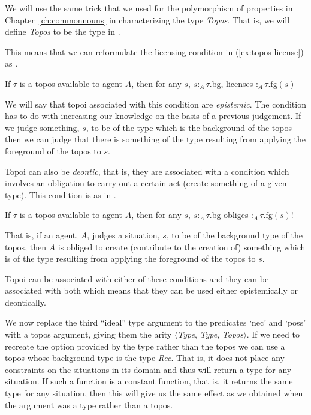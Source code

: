 We will use the same trick that we used
for the polymorphism of properties in Chapter~\ref{ch:commonnouns} in
characterizing the type \textit{Topos}.  That is, we will define
\textit{Topos} to be the type in \nexteg{}.
\begin{ex} 
\end{ex}

This means that we can reformulate the licensing condition in
(\ref{ex:topos-license}) as \nexteg{}.
\begin{ex} 
If $\tau$ is a topos available to agent $A$, then for any $s$,
$s:_A\tau.\mathrm{bg}$, licenses $:_A \tau.\mathrm{fg}(s)$ 
\end{ex} 
We will say that topoi associated with this condition are
\textit{epistemic}.  The condition has to do with increasing our
knowledge on the basis of a previous judgement.  If we judge
something, $s$,
to be of the type which is the background of the topos then we can
judge that there is something of the type resulting from applying the
foreground of the topos to $s$.

Topoi can also be \textit{deontic}, that is, they are associated with
a condition which involves an obligation to carry out a certain act
(create something of a given type).  This condition is as in
\nexteg{}.
\begin{ex} 
If $\tau$ is a topos available to agent $A$, then for any $s$,
$s:_A\tau.\mathrm{bg}$ obliges $:_A\tau.\mathrm{fg}(s)!$ 
\end{ex} 
That is, if an agent, $A$, judges a situation, $s$, to be of the
background type of the topos, then $A$ is obliged to create
(contribute to the creation of) something which is of the type
resulting from applying the foreground of the topos to $s$.

Topoi can be associated with either of these conditions and they can
be associated with both which means that they can be used either
epistemically or deontically.  
    
We now replace the third ``ideal'' type argument to the predicates `nec' and
`poss' with a topos argument, giving them the arity $\langle$\textit{Type}, \textit{Type},
\textit{Topos}$\rangle$.  If we need to recreate the option provided
by the type rather than the topos we can use a topos whose background
type is the type \textit{Rec}.  That is, it does not place any
constraints on the situations in its domain and thus will return a type for
any situation.  If such a function is a constant function, that is, it
returns the same type for any situation, then this will give us the
same effect as we obtained when the argument was a type rather than a
topos.

